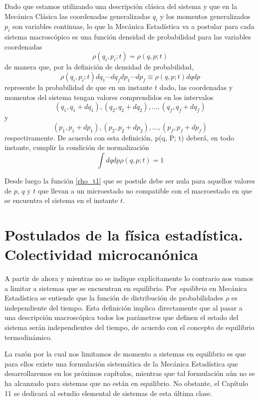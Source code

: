 Dado que estamos utilizando una descripción clásica del sistema y que en la Mecánica Clásica las coordenadas generalizadas $q_i$ y los momentos generalizados $p_i$ son variables continuas, lo que la Mecánica Estadística va a postular para cada sistema macroscópico es una función densidad de probabilidad para las variables coordenadas
\begin{equation}\label{rho_t1}
	\rho({q_i},{p_i}; t) = \rho(q,p; t)
\end{equation}
de manera que, por la definición de densidad de probabilidad,
\begin{equation}
	\rho({q_i},{p_i}; t)dq_1\cdots dq_f dp_1\cdots dp_f \equiv \rho(q,p; t) dqdp
\end{equation}
represente la probabilidad de que en un instante $t$ dado, las coordenadas y momentos del sistema tengan valores comprendidos en los intervalos
$$(q_1, q_1 + dq_1), (q_2, q_2 + dq_2), ... , (q_f, q_f + dq_f)$$
y
$$(p_1, p_1 + dp_1), (p_2, p_2 + dp_2), ... , (p_f, p_f + dp_f)$$
respectivamente. De acuerdo con esta definición, p(q, P; t) deberá, en todo instante,
cumplir la condición de normalización
\begin{equation}
	\int dqdp \rho(q,p; t) = 1
\end{equation}

Desde luego la función \eqref{rho_t1} que se postule debe ser nula para aquellos valores de $p$, $q$ y $t$ que llevan a un microestado no compatible con el macroestado en que se encuentra el sistema en el instante $t$.

\section{Postulados de la física estadística. Colectividad microcanónica}

A partir de ahora y mientras no se indique explícitamente lo contrario nos vamos a limitar a sistemas que se encuentran en equilibrio. 
Por \emph{equilibrio} en Mecánica Estadística se entiende que la función de distribución de probabilidades $\rho$ es independiente del tiempo.
Esta definición implica directamente que al pasar a una descripción macroscópica todos los parámetros que definen el estado del sistema serán independientes del tiempo, de acuerdo con el concepto de equilibrio termodinámico.

La razón por la cual nos limitamos de momento a sistemas en equilibrio es que para ellos existe una formulación sistemática de la Mecánica Estadística que desarrollaremos en los próximos capítulos, mientras que tal formulación aún no se ha alcanzado para sistemas que no están en equilibrio. No obstante, el Capítulo 11 se dedicará al estudio elemental de sistemas de esta última clase.

